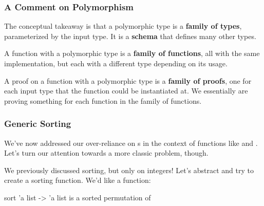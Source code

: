 \documentclass[aspectratio=169]{beamer}
\begin{document}
\begin{frame}[fragile]
  \frametitle{A Comment on Polymorphism}

  \tgs

  The conceptual takeaway is that a polymorphic type is a \textbf{family of types},
  parameterized by the input type. It is a \textbf{schema} that defines many other
  types.

  \pause
  \vspace{\fill}

  A function with a polymorphic type is a \textbf{family of functions}, all with
  the same implementation, but each with a different type depending on its usage.

  \pause
  \vspace{\fill}

  A proof on a function with a polymorphic type is a \textbf{family of proofs},
  one for each input type that the function could be instantiated at. We essentially
  are proving something for each function in the family of functions.
\end{frame}



\begin{frame}[fragile]
  \frametitle{Generic Sorting}

  We've now addressed our over-reliance on s in the context of functions like
   and . Let's turn our attention towards a more classic problem,
  though.

  \pause
  \vspace{\fill}

  We previously discussed sorting, but only on integers! Let's abstract and try to create a
   sorting function. We'd like a function:

  \pause
  \vspace{\fill}

  \spec
    {sort}
    {'a list -> 'a list}
    {}
    { is a sorted permutation of }

\end{frame}
\end{document}
